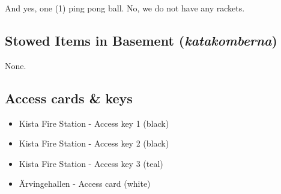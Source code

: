 \documentclass[12pt,a4paper]{article}
\begin{document}
			And yes, one (1) ping pong ball. No, we do not have any rackets.
		\subsection{Stowed Items in Basement (\emph{katakomberna})}
			None.
		\subsection{Access cards \& keys}
			\begin{itemize}
				\item{Kista Fire Station - Access key 1 (black)}
				\item{Kista Fire Station - Access key 2 (black)}
				\item{Kista Fire Station - Access key 3 (teal)}
				\item{Ärvingehallen - Access card (white)}
			\end{itemize}
\end{document}
